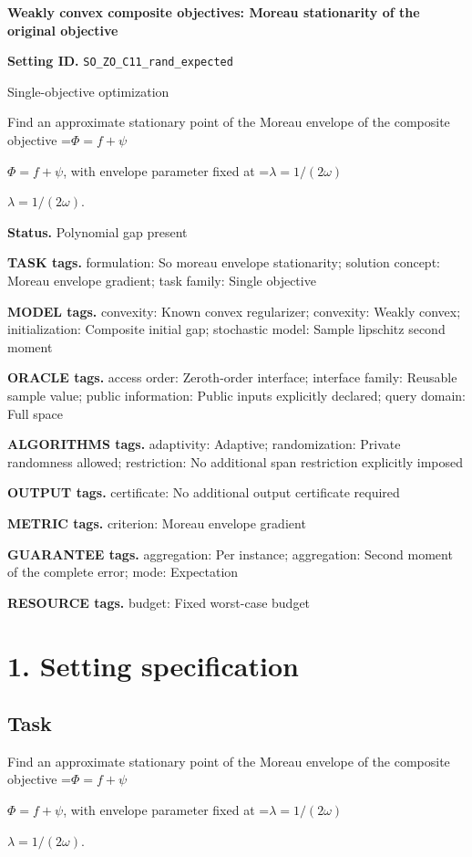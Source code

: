 \documentclass[10pt,a4paper]{article}
\newcommand{\AtlasMath}[1]{\par\begingroup\centering\setbox0=\hbox{$\displaystyle #1$}\ifdim\wd0>1.4\linewidth\typeout{ATLAS WIDE FORMULA: \the\wd0}\fi\ifdim\wd0>\linewidth\resizebox{\linewidth}{!}{\box0}\else\box0\fi\par\endgroup}
\newcommand{\AtlasInlineMath}[1]{\begingroup\setbox0=\hbox{$#1$}\ifdim\wd0>.4\linewidth\endgroup\AtlasMath{#1}\else\endgroup$#1$\fi}
\begin{document}
\raggedright

{\LARGE\bfseries\sffamily\color{AtlasNavy} Weakly convex composite objectives: Moreau stationarity of the original objective\par}\vspace{5pt}
\textbf{Setting ID.} \texttt{SO\_\allowbreak{}ZO\_\allowbreak{}C11\_\allowbreak{}rand\_\allowbreak{}expected}

Single-objective optimization

Find an approximate stationary point of the Moreau envelope of the composite objective \AtlasInlineMath{\Phi=f+\psi}, with envelope parameter fixed at \AtlasInlineMath{\lambda=1/(2\omega)}.

\textbf{Status.} Polynomial gap present

\textbf{TASK tags.} formulation: So moreau envelope stationarity; solution concept: Moreau envelope gradient; task family: Single objective

\textbf{MODEL tags.} convexity: Known convex regularizer; convexity: Weakly convex; initialization: Composite initial gap; stochastic model: Sample lipschitz second moment

\textbf{ORACLE tags.} access order: Zeroth-order interface; interface family: Reusable sample value; public information: Public inputs explicitly declared; query domain: Full space

\textbf{ALGORITHMS tags.} adaptivity: Adaptive; randomization: Private randomness allowed; restriction: No additional span restriction explicitly imposed

\textbf{OUTPUT tags.} certificate: No additional output certificate required

\textbf{METRIC tags.} criterion: Moreau envelope gradient

\textbf{GUARANTEE tags.} aggregation: Per instance; aggregation: Second moment of the complete error; mode: Expectation

\textbf{RESOURCE tags.} budget: Fixed worst-case budget

\section{1. Setting specification}
\subsection{Task}
Find an approximate stationary point of the Moreau envelope of the composite objective \AtlasInlineMath{\Phi=f+\psi}, with envelope parameter fixed at \AtlasInlineMath{\lambda=1/(2\omega)}.
\end{document}
